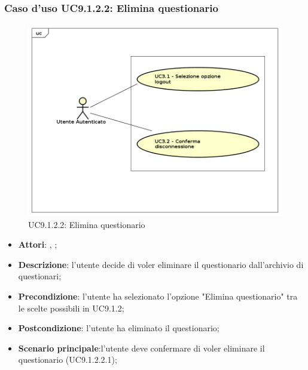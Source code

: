 			\subsubsection{Caso d'uso UC9.1.2.2: Elimina questionario}
			\label{UC9.1.2.2}
			\begin{figure}[h]
				\centering
			\includegraphics[scale=0.5,keepaspectratio]{UML/UC9.png}
				\caption{UC9.1.2.2: Elimina questionario}
			\end{figure}
			\FloatBarrier
			\begin{itemize}
				\item \textbf{Attori}: \uau, \uaupro;
				\item \textbf{Descrizione}: l'utente decide di voler eliminare il questionario dall'archivio di questionari;
				\item \textbf{Precondizione}: l'utente ha selezionato l'opzione "Elimina questionario" tra le scelte possibili in UC9.1.2;
				\item \textbf{Postcondizione}: l'utente ha eliminato il questionario;
				\item \textbf{Scenario principale}:l'utente deve confermare di voler eliminare il questionario (UC9.1.2.2.1);
			\end{itemize}
			
